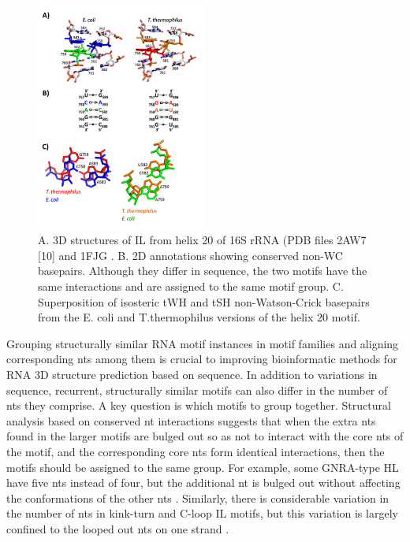 \begin{figure}
  \includegraphics[width=0.5\textwidth]{chapter-1/figs/IL-20}
  \caption{A. 3D structures of IL from helix 20 of 16S rRNA (PDB files 2AW7 [10]
    and 1FJG \cite{Carter2000}. B. 2D annotations showing conserved non-WC basepairs.
    Although they differ in sequence, the two motifs have the same interactions
    and are assigned to the same motif group. C. Superposition of isosteric tWH
    and tSH non-Watson-Crick basepairs from the E. coli and T.thermophilus
  versions of the helix 20 motif.}
  \label{fig:compare-il}
\end{figure}

Grouping structurally similar RNA motif instances in motif families and aligning
corresponding nts among them is crucial to improving bioinformatic methods for
RNA 3D structure prediction based on sequence. In addition to variations in
sequence, recurrent, structurally similar motifs can also differ in the number
of nts they comprise. A key question is which motifs to group together.
Structural analysis based on conserved nt interactions suggests that when the
extra nts found in the larger motifs are bulged out so as not to interact with
the core nts of the motif, and the corresponding core nts form identical
interactions, then the motifs should be assigned to the same group. For example,
some GNRA-type HL have five nts instead of four, but the additional nt is bulged
out without affecting the conformations of the other nts \cite{Nasalean2009b}.
Similarly, there is considerable variation in the number of nts in kink-turn and
C-loop IL motifs, but this variation is largely confined to the looped out nts
on one strand \cite{Lescoute2005}.

